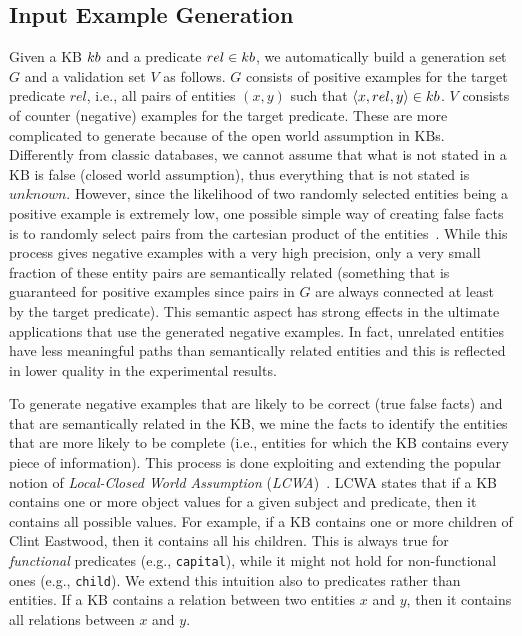 \subsection{Input Example Generation} \label{sec:ex_generation}
\vspace{-1ex}
Given a KB ${\sc kb}$ and a predicate $rel \in {\sc kb}$, we automatically build a generation set $G$ and a validation set $V$ as follows. 
$G$ consists of positive examples for the target predicate $rel$, i.e., all pairs of entities $(x,y)$ such that $\langle x,rel,y\rangle \in {\sc kb}$.
$V$ consists of counter (negative) examples for the target predicate.
These are more complicated to generate because of the open world assumption in KBs. 
Differently from classic databases, we cannot assume that what is not stated in a KB is false (closed world assumption), thus everything that is not stated is $unknown$. %
However, since the likelihood of two randomly selected entities being a positive example is extremely low, one possible simple way of creating false facts is to randomly select pairs from the cartesian product of the entities~\cite{muggleton1994inductive}. While this process gives negative examples with a very high precision, only a very small fraction of these entity pairs are semantically related (something that is guaranteed for positive examples since pairs in $G$ are always connected at least by the target predicate). This semantic aspect has strong effects in the ultimate applications that use the generated negative examples. In fact, unrelated entities have less meaningful paths than semantically related entities and this is reflected in lower quality in the experimental results. 

To generate negative examples that are likely to be correct (true false facts) and that are semantically related in the KB, we mine the facts to identify the entities that are more likely to be complete (i.e., entities for which the KB contains every piece of information). This process is done exploiting and extending the popular notion of \emph{Local-Closed World Assumption} (\emph{LCWA})~\cite{dong2014data,galarraga2015fast}. 
%
LCWA states that if a KB contains one or more object values for a given subject and predicate, then it contains all possible values. For example, if a KB contains one or more children of Clint Eastwood, then it contains all his children. This is always true for \emph{functional} predicates (e.g., \texttt{capital}), 
while it might not hold for non-functional ones (e.g., \texttt{child}). 
We extend this intuition also to predicates rather than entities. If a KB contains a relation between two entities $x$ and $y$, then it contains all relations between $x$ and $y$.

